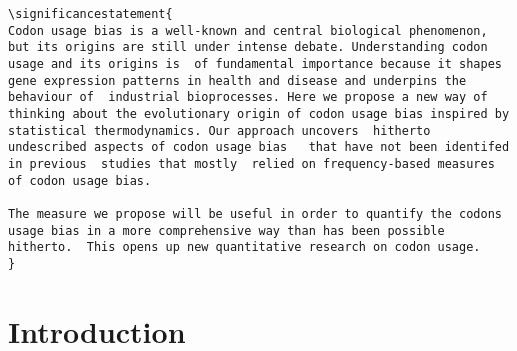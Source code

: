 \documentclass[a4paper,10pt]{paper}%
\begin{document}
\begin{verbatim}
\significancestatement{
Codon usage bias is a well-known and central biological phenomenon, but its origins are still under intense debate. Understanding codon usage and its origins is  of fundamental importance because it shapes gene expression patterns in health and disease and underpins the behaviour of  industrial bioprocesses. Here we propose a new way of thinking about the evolutionary origin of codon usage bias inspired by statistical thermodynamics. Our approach uncovers  hitherto undescribed aspects of codon usage bias   that have not been identifed  in previous  studies that mostly  relied on frequency-based measures of codon usage bias.

The measure we propose will be useful in order to quantify the codons usage bias in a more comprehensive way than has been possible hitherto.  This opens up new quantitative research on codon usage. 
}
 \end{verbatim}



\section{Introduction }
\end{document}
